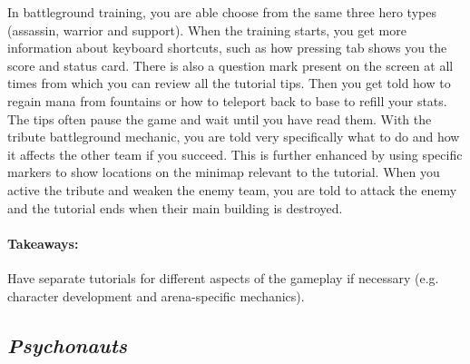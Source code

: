 In battleground training, you are able choose from the same three hero types (assassin, warrior and support).
When the training starts, you get more information about keyboard shortcuts, such as how pressing tab shows you the score and status card.
There is also a question mark present on the screen at all times from which you can review all the tutorial tips.
Then you get told how to regain mana from fountains or how to teleport back to base to refill your stats.
The tips often pause the game and wait until you have read them.
With the tribute battleground mechanic, you are told very specifically what to do and how it affects the other team if you succeed. This is further enhanced by using specific markers to show locations on the minimap relevant to the tutorial.
When you active the tribute and weaken the enemy team, you are told to attack the enemy and the tutorial ends when their main building is destroyed.
\paragraph{Takeaways:}
Have separate tutorials for different aspects of the gameplay if necessary (e.g. character development and arena-specific mechanics).

\subsection{\textit{Psychonauts}}
